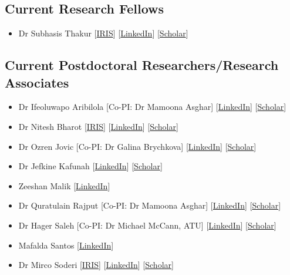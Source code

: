 \documentclass[10pt,a4paper]{res} %
\begin{document}
\begin{resume}
\subsection*{Current Research Fellows}

\begin{itemize} \itemsep -2pt
\item Dr Subhasis Thakur
[\href{https://www.universityofgalway.ie/science-engineering/staff-profiles/subhasisthakur/}{IRIS}]
[\href{https://www.linkedin.com/in/subhasis-thakur/}{LinkedIn}]
[\href{https://scholar.google.com/citations?hl=en&user=B92RJCQAAAAJ}{Scholar}]
\end{itemize}

\subsection*{Current Postdoctoral Researchers/Research Associates}

\begin{itemize} \itemsep -2pt
\item Dr Ifeoluwapo Aribilola
[Co-PI: Dr Mamoona Asghar]
[\href{https://www.linkedin.com/in/ifeoluwapo-aribilola-205a63a1/}{LinkedIn}]
[\href{https://scholar.google.com/citations?user=koH5UckAAAAJ&hl=en}{Scholar}]
\item Dr Nitesh Bharot
[\href{https://www.universityofgalway.ie/science-engineering/staff-profiles/niteshbharot/}{IRIS}]
[\href{https://www.linkedin.com/in/nitesh-bharot-72bb2049/}{LinkedIn}]
[\href{https://scholar.google.com/citations?hl=en&user=jmX6gMMAAAAJ}{Scholar}]
\item Dr Ozren Jovic
[Co-PI: Dr Galina Brychkova]
[\href{https://www.linkedin.com/in/ozren-jovi%C4%87-a8a775135/}{LinkedIn}]
[\href{https://scholar.google.com/citations?hl=en&user=7WQX2AMAAAAJ}{Scholar}]
\item Dr Jefkine Kafunah
[\href{https://www.linkedin.com/in/jefkine/}{LinkedIn}]
[\href{https://scholar.google.com/citations?hl=en&user=ftmf0kAAAAAJ}{Scholar}]
\item Zeeshan Malik
[\href{https://www.linkedin.com/in/zeeshan-malik-85517a20/}{LinkedIn}]
\item Dr Quratulain Rajput
[Co-PI: Dr Mamoona Asghar]
[\href{https://www.linkedin.com/in/ms-quratulain-rajput-535a4112/}{LinkedIn}]
[\href{https://scholar.google.com/citations?hl=en&user=vSbsI1IAAAAJ}{Scholar}]
\item Dr Hager Saleh
[Co-PI: Dr Michael McCann, ATU]
[\href{https://www.linkedin.com/in/hager-saleh-4a373175/}{LinkedIn}]
[\href{https://scholar.google.com/citations?hl=en&user=_zj4eUUAAAAJ}{Scholar}]
\item Mafalda Santos
[\href{https://www.linkedin.com/in/mafalda-santos-%F0%9F%87%B5%F0%9F%87%B9%F0%9F%87%AE%F0%9F%87%AA-859b64181/}{LinkedIn}]
\item Dr Mirco Soderi
[\href{https://www.universityofgalway.ie/science-engineering/staff-profiles/mircosoderi/}{IRIS}]
[\href{https://www.linkedin.com/in/mirco-soderi-3b470525/}{LinkedIn}]
[\href{https://scholar.google.com/citations?hl=en&user=rVXaN2QAAAAJ}{Scholar}]
\end{itemize}


\end{resume}
\end{document}
